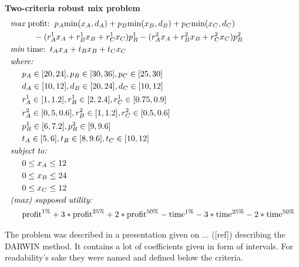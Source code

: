 \begin{description}
  \item{\textbf{Two-criteria robust mix problem}}
    \begin{align*}
      & \textit{max}\text{ profit:} \hspace{0.2cm} p_A \text{min}(x_A, d_A)
      + p_B \text{min}(x_B, d_B) +  p_C \text{min}(x_C, d_C) \\
      & \hspace{1cm} - (r^1_Ax_A + r^1_Bx_B + r^1_Cx_C) p^1_R
      - (r^2_Ax_A + r^2_Bx_B + r^2_Cx_C) p^2_R\\
      & \textit{min}\text{ time:} \hspace{0.2cm} t_Ax_A + t_Bx_B + t_Cx_C \\
      & \textit{where:} \\
      & \hspace{0.5cm} p_A \in [20, 24], p_B \in [30, 36], p_C \in [25, 30] \\
      & \hspace{0.5cm} d_A \in [10, 12], d_B \in [20, 24], d_C \in [10, 12] \\
      & \hspace{0.5cm} r^1_A \in [1, 1.2], r^1_B \in [2, 2.4], r^1_C \in [0.75, 0.9] \\ 
      & \hspace{0.5cm} r^2_A \in [0,5, 0.6], r^2_B \in [1, 1.2], r^2_C \in [0.5, 0.6] \\ 
      & \hspace{0.5cm} p^1_R \in [6, 7.2], p^2_R \in [9, 9.6] \\
      & \hspace{0.5cm} t_A \in [5, 6], t_B \in [8, 9.6], t_C \in [10, 12] \\ 
      & \textit{subject to:} \\
      & \hspace{0.5cm} 0 \le x_A \le 12 \\
      & \hspace{0.5cm} 0 \le x_B \le 24 \\
      & \hspace{0.5cm} 0 \le x_C \le 12 \\
      & \textit{(max) supposed utility:} \\
      & \hspace{0.5cm} \text{profit}^{1\%} + 3 * \text{profit}^{25\%}
      + 2 * \text{profit}^{50\%} - \text{time}^{1\%}
      - 3 * \text{time}^{25\%} - 2 * \text{time}^{50\%} 
    \end{align*}
    
    
    The problem was described in a presentation given on ... ([ref])
    describing the DARWIN method. It contains a lot of coefficients given in
    form of intervals. For readability's sake they were named and defined
    below the criteria.


\end{description}
